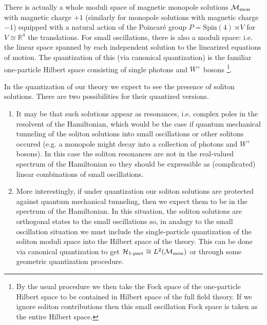 \documentclass[12pt, onecolumn]{article}
\begin{document}
\vspace{5mm}

\noindent There is actually a whole moduli space of magnetic monopole solutions ${\cal M}_{\text{mon}}$ with magnetic charge $+1$ (similarly for monopole solutions with magnetic charge $-1$) equipped with a natural action of the Poincar\'{e} group $P=\text{Spin}(4) \rtimes V$ for $V \cong \mathbb{R}^{4}$ the translations.  For small oscillations, there is also a moduli space: i.e. the linear space spanned by each independent solution to the linearized equations of motion.  The quantization of this (via canonical quantization) is the familiar one-particle Hilbert space consisting of single photons and $W^{+}$ bosons \footnote{By the usual procedure we then take the Fock space of the one-particle Hilbert space to be contained in Hilbert space of the full field theory.  If we ignore soliton contributions then this small oscillation Fock space is taken as the entire Hilbert space.}.

\vspace{5mm}

\noindent In the quantization of our theory we expect to see the presence of soliton solutions.  There are two possibilities for their quantized versions.
\begin{enumerate}
\item It may be that such solutions appear as resonances, i.e. complex poles in the resolvent of the Hamiltonian, which would be the case if quantum mechanical tunneling of the soliton solutions into small oscillations or other solitons occured (e.g. a monopole might decay into a collection of photons and $W^{+}$ bosons).  In this case the soliton resonances are not in the real-valued spectrum of the Hamiltonian so they should be expressible as (complicated) linear combinations of small oscillations.  
\item More interestingly, if under quantization our soliton solutions are protected against quantum mechanical tunneling, then we expect them to be in the spectrum of the Hamiltonian.  In this situation, the soliton solutions are orthogonal states to the small oscillations so, in analogy to the small oscillation situation we must include the single-particle quantization of the soliton moduli space into the Hilbert space of the theory.  This can be done via canonical quantization to get ${\cal H}_{\text{1-part}} \cong L^2(\mathbb{\cal M}_{\text{mon}})$ or through some geometric quantization procedure.
\end{enumerate}
\end{document}
